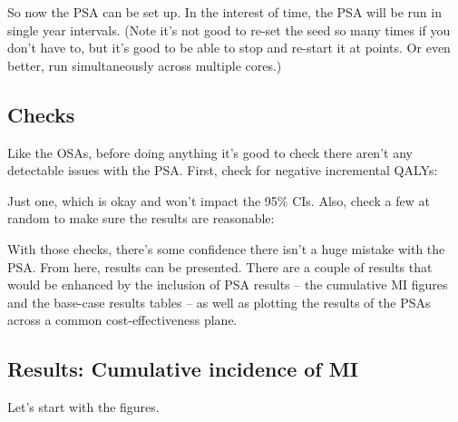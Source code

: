 \documentclass[11pt]{article}
\begin{document}
So now the PSA can be set up. In the interest of time, the PSA will be run in single year intervals.
(Note it's not good to re-set the seed so many times if you don't have to, but it's good to 
be able to stop and re-start it at points. Or even better, run simultaneously across multiple
cores.)

\color{Blue4}
\begin{stlog}\end{stlog}
\color{black}

\subsection{Checks}

Like the OSAs, before doing anything it's good to check there aren't any detectable issues with the PSA. 
First, check for negative incremental QALYs: 

\color{Blue4}
\begin{stlog}\end{stlog}
\color{black}

Just one, which is okay and won't impact the 95\% CIs. 
Also, check a few at random to make sure the results are reasonable:

\color{Blue4}
\begin{stlog}\end{stlog}
\color{black}

With those checks, there's some confidence there isn't a huge mistake with the PSA.
From here, results can be presented. There are a couple of results that would be enhanced
by the inclusion of PSA results -- the cumulative MI figures and the base-case results
tables -- as well as plotting the results of the PSAs across a common cost-effectiveness
plane. 

\subsection{Results: Cumulative incidence of MI}

Let's start with the figures.
\end{document}
